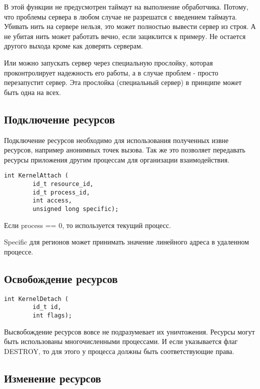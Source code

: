 В этой функции не предусмотрен таймаут на выполнение обработчика. Потому, что
проблемы сервера в любом случае не разрешатся с введением таймаута. Убивать
нить на сервере нельзя, это может  полностью вывести сервер из строя. А не
убитая нить может работать вечно, если зациклится к примеру. Не остается другого
выхода кроме как доверять серверам.

Или можно запускать сервер через специальную прослойку, которая проконтролирует
надежность его работы, а в случае проблем - просто перезапустит сервер. Эта
прослойка (специальный сервер) в принципе может быть одна на всех.

\subsection{Подключение ресурсов}

Подключение ресурсов необходимо для использования полученных извне ресурсов,
например анонимных точек вызова. Так же это позволяет передавать ресурсы
приложения другим процессам для организации взаимодействия.

\begin{verbatim}
int KernelAttach (
        id_t resource_id,
        id_t process_id,
        int access,
        unsigned long specific);
\end{verbatim}\par

Если process == 0, то используется текущий процесс.

Specific для регионов может принимать значение линейного адреса в удаленном
процессе.

\subsection{Освобождение ресурсов}

\begin{verbatim}
int KernelDetach (
        id_t id,
        int flags);
\end{verbatim}\par

Высвобождение ресурсов вовсе не подразумевает их уничтожения. Ресурсы могут быть
использованы многочисленными процессами. И если указывается флаг DESTROY, то для
этого у процесса должны быть соответствующие права.

\subsection{Изменение ресурсов}

